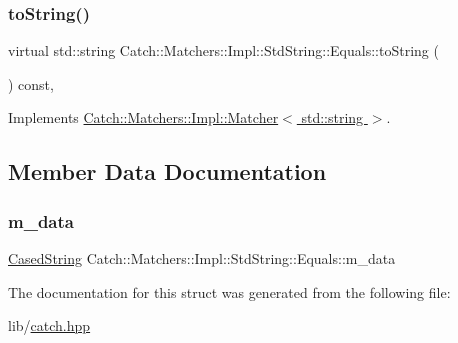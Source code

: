 \subsubsection{\texorpdfstring{to\+String()}{toString()}}
{\footnotesize\ttfamily virtual std\+::string Catch\+::\+Matchers\+::\+Impl\+::\+Std\+String\+::\+Equals\+::to\+String (\begin{DoxyParamCaption}{ }\end{DoxyParamCaption}) const\hspace{0.3cm}{\ttfamily [inline]}, {\ttfamily [virtual]}}



Implements \hyperlink{struct_catch_1_1_matchers_1_1_impl_1_1_matcher_a091bcc37e589967d7e10fc7790d820e2}{Catch\+::\+Matchers\+::\+Impl\+::\+Matcher$<$ std\+::string $>$}.



\subsection{Member Data Documentation}
\hypertarget{struct_catch_1_1_matchers_1_1_impl_1_1_std_string_1_1_equals_ae09964b7ba291ce574b514a2ee3eddb0}{}\label{struct_catch_1_1_matchers_1_1_impl_1_1_std_string_1_1_equals_ae09964b7ba291ce574b514a2ee3eddb0} 
\subsubsection{\texorpdfstring{m\+\_\+data}{m\_data}}
{\footnotesize\ttfamily \hyperlink{struct_catch_1_1_matchers_1_1_impl_1_1_std_string_1_1_cased_string}{Cased\+String} Catch\+::\+Matchers\+::\+Impl\+::\+Std\+String\+::\+Equals\+::m\+\_\+data}



The documentation for this struct was generated from the following file\+:\begin{DoxyCompactItemize}
\item 
lib/\hyperlink{catch_8hpp}{catch.\+hpp}\end{DoxyCompactItemize}
